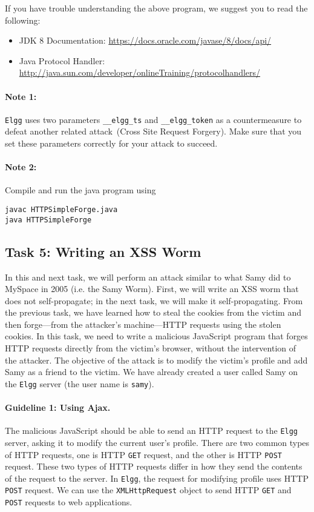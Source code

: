 If you have trouble understanding the above program, 
we suggest you to read the following:

\begin{itemize}
\item JDK 8 Documentation: \url{https://docs.oracle.com/javase/8/docs/api/}
\item Java Protocol Handler:\\ 
\url{http://java.sun.com/developer/onlineTraining/protocolhandlers/}
\end{itemize}

\paragraph{Note 1:} {\tt Elgg} uses two parameters {\tt \_\_elgg\_ts} and
{\tt \_\_elgg\_token} as a countermeasure to defeat another related 
attack~(Cross Site Request Forgery). Make sure that you set these 
parameters correctly for your attack to succeed.

\paragraph{Note 2:} Compile and run the java program using

\begin{Verbatim}
javac HTTPSimpleForge.java
java HTTPSimpleForge
\end{Verbatim}


\subsection{Task 5: Writing an XSS Worm}

In this and next task, we will perform an attack similar to what Samy did 
to MySpace in 2005 (i.e. the Samy Worm). First, we will write an XSS 
worm that does not self-propagate; in the next task, we will make it 
self-propagating.
From the previous task, we have learned how to steal the cookies from the victim 
and then forge---from the attacker's machine---HTTP requests using the stolen cookies.
In this task, we need to write a malicious JavaScript program that forges HTTP requests 
directly from the victim's browser, without the intervention of 
the attacker.  The objective of the attack is to modify the victim's 
profile and add Samy as a friend to the victim. We have already created a
user called Samy on the {\tt Elgg} server (the user name is {\tt samy}).


\paragraph{Guideline 1: Using Ajax.} The malicious JavaScript should be able to 
send an HTTP request to the {\tt Elgg} server, asking it to modify
the current user's profile. There are two common types of HTTP requests, 
one is HTTP {\tt GET} request,
and the other is HTTP {\tt POST} request. These two types of HTTP requests
differ in how they send the contents of the request to the server. 
In {\tt Elgg}, the request for modifying profile uses HTTP {\tt POST}
request. We can use the {\tt XMLHttpRequest} object to send 
HTTP {\tt GET} and {\tt POST} requests to web applications. 

